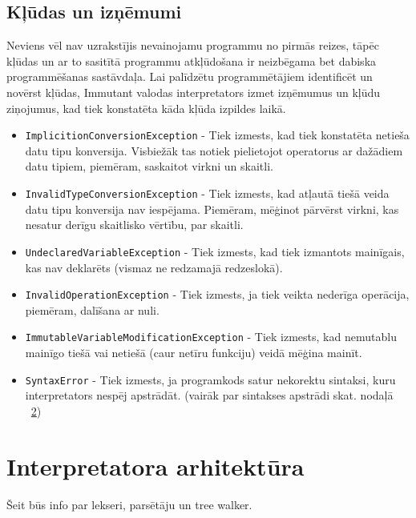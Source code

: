\documentclass[12pt,a4paper]{report}
\begin{document}
\section{Kļūdas un izņēmumi}


Neviens vēl nav uzrakstījis nevainojamu programmu no pirmās reizes, tāpēc kļūdas un ar to sasitītā programmu atkļūdošana ir neizbēgama bet dabiska programmēšanas sastāvdaļa. Lai palīdzētu programmētājiem identificēt un novērst kļūdas, Immutant valodas interpretators izmet izņēmumus un kļūdu ziņojumus, kad tiek konstatēta kāda kļūda izpildes laikā. 
\begin{itemize}
  \item \texttt{ImplicitionConversionException} - Tiek izmests, kad tiek konstatēta netieša datu tipu konversija. Visbiežāk tas notiek pielietojot operatorus ar dažādiem datu tipiem, piemēram, saskaitot virkni un skaitli.
  \item \texttt{InvalidTypeConversionException} - Tiek izmests, kad atļautā tiešā veida datu tipu konversija nav iespējama. Piemēram, mēģinot pārvērst virkni, kas nesatur derīgu skaitlisko vērtību, par skaitli.
  \item \texttt{UndeclaredVariableException} - Tiek izmests, kad tiek izmantots mainīgais, kas nav deklarēts (vismaz ne redzamajā redzeslokā). 
  \item \texttt{InvalidOperationException} - Tiek izmests, ja tiek veikta nederīga operācija, piemēram, dalīšana ar nuli.
  \item \texttt{ImmutableVariableModificationException} - Tiek izmests, kad nemutablu mainīgo tiešā vai netiešā (caur netīru funkciju) veidā mēģina mainīt.
  \item \texttt{SyntaxError} - Tiek izmests, ja programkods satur nekorektu sintaksi, kuru interpretators nespēj apstrādāt. (vairāk par sintakses apstrādi skat. nodaļā ~\ref{chap:arch})
\end{itemize}

\chapter{Interpretatora arhitektūra}
\label{chap:arch}

Šeit būs info par lekseri, parsētāju un tree walker.



   
\end{document}
